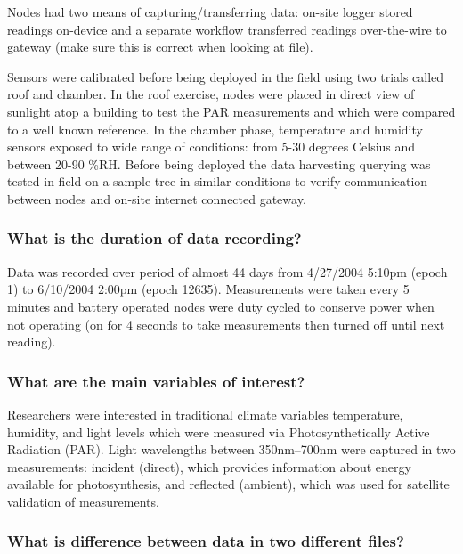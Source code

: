 \documentclass[
  twocolumn]{article}
\begin{document}
Nodes had two means of capturing/transferring data: on-site logger
stored readings on-device and a separate workflow transferred readings
over-the-wire to gateway (make sure this is correct when looking at
file).

Sensors were calibrated before being deployed in the field using two
trials called roof and chamber. In the roof exercise, nodes were placed
in direct view of sunlight atop a building to test the PAR measurements
and which were compared to a well known reference. In the chamber phase,
temperature and humidity sensors exposed to wide range of conditions:
from 5-30 degrees Celsius and between 20-90 \%RH. Before being deployed
the data harvesting querying was tested in field on a sample tree in
similar conditions to verify communication between nodes and on-site
internet connected gateway.

\hypertarget{what-is-the-duration-of-data-recording}{%
\subsubsection{What is the duration of data
recording?}\label{what-is-the-duration-of-data-recording}}

Data was recorded over period of almost 44 days from 4/27/2004 5:10pm
(epoch 1) to 6/10/2004 2:00pm (epoch 12635). Measurements were taken
every 5 minutes and battery operated nodes were duty cycled to conserve
power when not operating (on for 4 seconds to take measurements then
turned off until next reading).

\hypertarget{what-are-the-main-variables-of-interest}{%
\subsubsection{What are the main variables of
interest?}\label{what-are-the-main-variables-of-interest}}

Researchers were interested in traditional climate variables
temperature, humidity, and light levels which were measured via
Photosynthetically Active Radiation (PAR). Light wavelengths between
350nm--700nm were captured in two measurements: incident (direct), which
provides information about energy available for photosynthesis, and
reflected (ambient), which was used for satellite validation of
measurements.

\hypertarget{what-is-difference-between-data-in-two-different-files}{%
\subsubsection{What is difference between data in two different
files?}\label{what-is-difference-between-data-in-two-different-files}}
\end{document}
